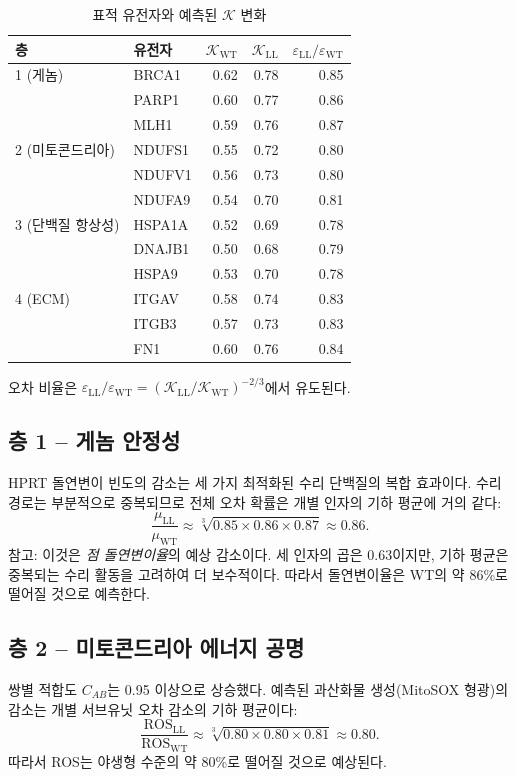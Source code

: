\documentclass[12pt,a4paper]{article}
\newcommand{\REL}{\mathcal{K}}          %
\begin{document}
	\begin{table}[H]
		\centering
		\caption{표적 유전자와 예측된 \(\REL\) 변화}
		\label{tab:targets}
		\begin{tabular}{@{}llrrr@{}}
			\toprule
			\textbf{층} & \textbf{유전자} & \(\REL_{\mathrm{WT}}\) & \(\REL_{\mathrm{LL}}\) & \(\varepsilon_{\mathrm{LL}}/\varepsilon_{\mathrm{WT}}\) \\
			\midrule
			1 (게놈)    & BRCA1 & 0.62 & 0.78 & 0.85 \\
			& PARP1 & 0.60 & 0.77 & 0.86 \\
			& MLH1  & 0.59 & 0.76 & 0.87 \\
			2 (미토콘드리아) & NDUFS1 & 0.55 & 0.72 & 0.80 \\
			& NDUFV1 & 0.56 & 0.73 & 0.80 \\
			& NDUFA9 & 0.54 & 0.70 & 0.81 \\
			3 (단백질 항상성) & HSPA1A & 0.52 & 0.69 & 0.78 \\
			& DNAJB1 & 0.50 & 0.68 & 0.79 \\
			& HSPA9  & 0.53 & 0.70 & 0.78 \\
			4 (ECM)    & ITGAV  & 0.58 & 0.74 & 0.83 \\
			& ITGB3  & 0.57 & 0.73 & 0.83 \\
			& FN1    & 0.60 & 0.76 & 0.84 \\
			\bottomrule
		\end{tabular}
		\footnotesize 오차 비율은 \(\varepsilon_{\mathrm{LL}}/\varepsilon_{\mathrm{WT}} = (\REL_{\mathrm{LL}}/\REL_{\mathrm{WT}})^{-2/3}\)에서 유도된다.
	\end{table}
	
	\subsection{층 1 – 게놈 안정성}
	HPRT 돌연변이 빈도의 감소는 세 가지 최적화된 수리 단백질의 복합 효과이다. 수리 경로는 부분적으로 중복되므로 전체 오차 확률은 개별 인자의 기하 평균에 거의 같다:
	\[
	\frac{\mu_{\mathrm{LL}}}{\mu_{\mathrm{WT}}} \approx \sqrt[3]{0.85 \times 0.86 \times 0.87} \approx 0.86.
	\]
	참고: 이것은 \emph{점 돌연변이율}의 예상 감소이다. 세 인자의 곱은 \(0.63\)이지만, 기하 평균은 중복되는 수리 활동을 고려하여 더 보수적이다. 따라서 돌연변이율은 WT의 약 86\%로 떨어질 것으로 예측한다.
	
	\subsection{층 2 – 미토콘드리아 에너지 공명}
	쌍별 적합도 \(C_{AB}\)는 0.95 이상으로 상승했다. 예측된 과산화물 생성(MitoSOX 형광)의 감소는 개별 서브유닛 오차 감소의 기하 평균이다:
	\[
	\frac{\mathrm{ROS}_{\mathrm{LL}}}{\mathrm{ROS}_{\mathrm{WT}}} \approx \sqrt[3]{0.80 \times 0.80 \times 0.81} \approx 0.80.
	\]
	따라서 ROS는 야생형 수준의 약 80\%로 떨어질 것으로 예상된다.
	
\end{document}
